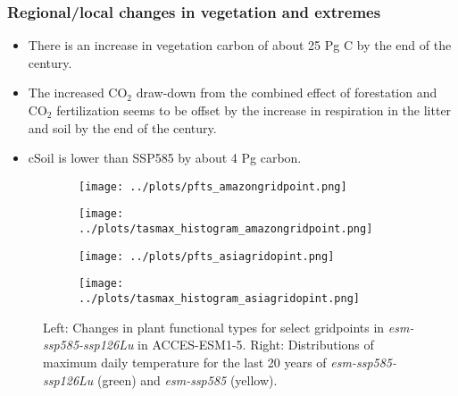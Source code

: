 \documentclass[]{article}
\begin{document}
\subsubsection{Regional/local changes in vegetation and extremes}

\begin{itemize}
    \item There is an increase in vegetation carbon of about 25 Pg C by the end of the century.
    \item The increased CO$_2$ draw-down from the combined effect of forestation and CO$_2$ fertilization seems to be offset by the increase in respiration in the litter and soil by the end of the century.
    \item cSoil is lower than SSP585 by about 4 Pg carbon.
\end{itemize}

\begin{figure}[H]
    \centering
    \begin{subfigure}[b]{0.4\linewidth}
        \texttt{[image: ../plots/pfts\_amazongridpoint.png]}
    \end{subfigure}
    \begin{subfigure}[b]{0.4\linewidth}
        \texttt{[image: ../plots/tasmax\_histogram\_amazongridpoint.png]}
    \end{subfigure}
    \begin{subfigure}[b]{0.4\linewidth}
        \texttt{[image: ../plots/pfts\_asiagridopint.png]}
    \end{subfigure}
    \begin{subfigure}[b]{0.4\linewidth}
        \texttt{[image: ../plots/tasmax\_histogram\_asiagridopint.png]}
    \end{subfigure}
    \caption{Left: Changes in plant functional types for select gridpoints in \textit{esm-ssp585-ssp126Lu} in ACCES-ESM1-5. Right: Distributions of maximum daily temperature for the last 20 years of \textit{esm-ssp585-ssp126Lu} (green) and \textit{esm-ssp585} (yellow).}
    \label{fig:tasmax_distribution}
\end{figure}
\end{document}
